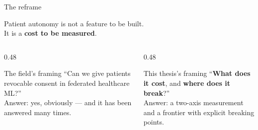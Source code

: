 \documentclass[aspectratio=169, 11pt]{beamer}
\newcommand{\hl}[1]{{\color{mCoral}\textbf{#1}}}
\begin{document}
\begin{frame}{The reframe}
\begin{center}
\Large
Patient autonomy is not a feature to be built.\\[0.5em]
It is a \hl{cost to be measured}.
\end{center}
\vspace{1.0em}
\begin{columns}[T]
\begin{column}{0.48\textwidth}
\begin{block}{The field's framing}
``Can we give patients revocable consent in federated healthcare ML?''\\[0.3em]
{\footnotesize Answer: yes, obviously --- and it has been answered many times.}
\end{block}
\end{column}
\begin{column}{0.48\textwidth}
\begin{exampleblock}{This thesis's framing}
``\textbf{What does it cost}, and \textbf{where does it break}?''\\[0.3em]
{\footnotesize Answer: a two-axis measurement and a frontier with explicit
breaking points.}
\end{exampleblock}
\end{column}
\end{columns}
\end{frame}
\end{document}
